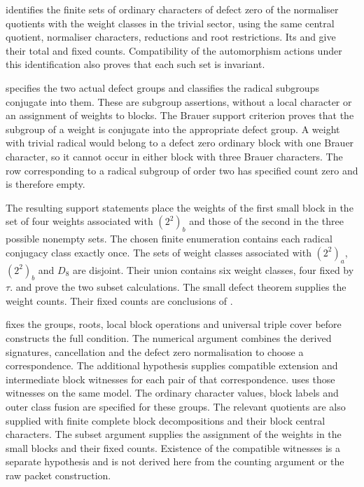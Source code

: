 \begin{implementation}
 identifies the
finite sets of ordinary characters of defect zero of the normaliser quotients with the weight classes in the trivial sector, using the same central
quotient, normaliser characters, reductions and root restrictions. Its
 and  give their total and fixed
counts. Compatibility of the automorphism actions under this identification also proves that each such set is invariant.

specifies the two actual defect groups and classifies the
radical subgroups conjugate into them. These are subgroup
assertions, without a local character or an assignment of
weights to blocks. The Brauer support criterion proves that
the subgroup of a weight is conjugate into the appropriate
defect group. A weight with trivial radical would belong to a
defect zero ordinary block with one Brauer character, so it
cannot occur in either block with three Brauer characters.
The row corresponding to a radical subgroup of order two has specified
count zero and is therefore empty.

The resulting support statements place the weights of the first small block in the set of four weights associated with $(2^2)_b$ and those of the second in the three possible nonempty sets. The chosen finite enumeration contains each radical conjugacy class exactly once. The sets of weight classes associated with $(2^2)_a$, $(2^2)_b$ and $D_8$ are disjoint. Their union contains six weight classes, four fixed by $\tau$.
 and
 prove the two subset
calculations. The small defect theorem supplies the weight counts.
Their fixed counts are conclusions of
.

 fixes the
groups, roots, local block operations and universal triple cover
before  constructs the full condition.
The numerical argument combines the derived signatures, cancellation and
the defect zero normalisation to choose a correspondence. The additional
 hypothesis supplies compatible extension and
intermediate block witnesses for each pair of that correspondence.
 uses those witnesses on the same model.
The ordinary character values, block labels and outer class fusion are
specified for these groups. The relevant quotients are also supplied with
finite complete block decompositions and their block central characters.
The subset argument supplies the assignment of the weights in the small
blocks and their fixed
counts. Existence of the compatible witnesses is a separate hypothesis
and is not derived here from the counting argument or the raw packet construction.
\end{implementation}

